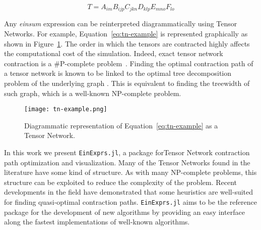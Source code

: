\documentclass{juliacon}
\begin{document}
\begin{equation}\label{eq:tn-example}
    T = A_{im} B_{ijp} C_{jkn} D_{klp} E_{mno} F_{lo} 
\end{equation} 

Any \textit{einsum} expression can be reinterpreted diagrammatically using Tensor Networks. For example, Equation~\ref{eq:tn-example} is represented graphically as shown in Figure~\ref{fig:tn-example}. The order in which the tensors are contracted highly affects the computational cost of the simulation. Indeed, exact tensor network contraction is a \#P-complete problem~\cite{garcia2012exact}. Finding the optimal contraction path of a tensor network is known to be linked to the optimal tree decomposition problem of the underlying graph \cite{markov2008simulating}. This is equivalent to finding the treewidth of such graph, which is a well-known NP-complete problem.

\begin{figure}[h]
    \centering
        
    \texttt{[image: tn-example.png]}
    \caption{Diagrammatic representation of Equation~\ref{eq:tn-example} as a Tensor Network.}
    \label{fig:tn-example}
\end{figure}


In this work we present \texttt{EinExprs.jl}, a package forTensor Network contraction path optimization and visualization. Many of the Tensor Networks found in the literature have some kind of structure. As with many NP-complete problems, this structure can be exploited to reduce the complexity of the problem. Recent developments in the field have demonstrated that some heuristics are well-suited for finding quasi-optimal contraction paths. \texttt{EinExprs.jl} aims to be the reference package for the development of new algorithms by providing an easy interface along the fastest implementations of well-known algorithms.
\end{document}
